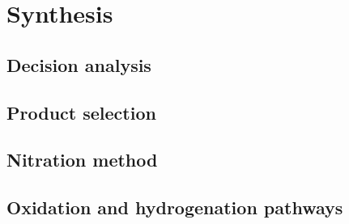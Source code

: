 \section{Synthesis}
\label{sec:synthesis}
\subsection{Decision analysis}
\subsection{Product selection}
\subsection{Nitration method}
\subsection{Oxidation and hydrogenation pathways}